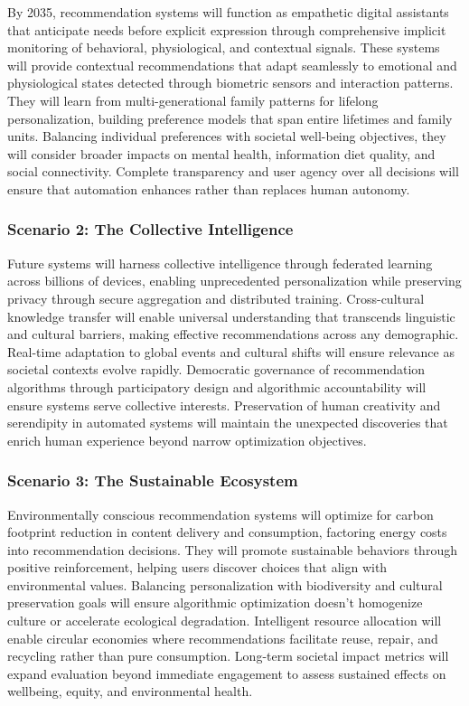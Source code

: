By 2035, recommendation systems will function as empathetic digital assistants that anticipate needs before explicit expression through comprehensive implicit monitoring of behavioral, physiological, and contextual signals. These systems will provide contextual recommendations that adapt seamlessly to emotional and physiological states detected through biometric sensors and interaction patterns. They will learn from multi-generational family patterns for lifelong personalization, building preference models that span entire lifetimes and family units. Balancing individual preferences with societal well-being objectives, they will consider broader impacts on mental health, information diet quality, and social connectivity. Complete transparency and user agency over all decisions will ensure that automation enhances rather than replaces human autonomy.

\subsubsection{Scenario 2: The Collective Intelligence}

Future systems will harness collective intelligence through federated learning across billions of devices, enabling unprecedented personalization while preserving privacy through secure aggregation and distributed training. Cross-cultural knowledge transfer will enable universal understanding that transcends linguistic and cultural barriers, making effective recommendations across any demographic. Real-time adaptation to global events and cultural shifts will ensure relevance as societal contexts evolve rapidly. Democratic governance of recommendation algorithms through participatory design and algorithmic accountability will ensure systems serve collective interests. Preservation of human creativity and serendipity in automated systems will maintain the unexpected discoveries that enrich human experience beyond narrow optimization objectives.

\subsubsection{Scenario 3: The Sustainable Ecosystem}

Environmentally conscious recommendation systems will optimize for carbon footprint reduction in content delivery and consumption, factoring energy costs into recommendation decisions. They will promote sustainable behaviors through positive reinforcement, helping users discover choices that align with environmental values. Balancing personalization with biodiversity and cultural preservation goals will ensure algorithmic optimization doesn't homogenize culture or accelerate ecological degradation. Intelligent resource allocation will enable circular economies where recommendations facilitate reuse, repair, and recycling rather than pure consumption. Long-term societal impact metrics will expand evaluation beyond immediate engagement to assess sustained effects on wellbeing, equity, and environmental health.

